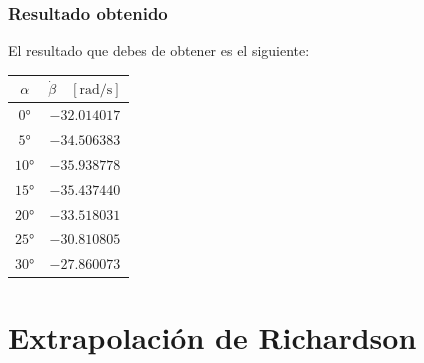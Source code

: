 \begin{frame}[fragile]
\frametitle{Resultado obtenido}
El resultado que debes de obtener es el siguiente:
\begin{table}
\centering
\fontsize{12}{12}\selectfont
\begin{tabular}{c | c}
$\alpha$ & $\dot{\beta} \quad [\si{\radian / \second}]$ \\ \hline
$\ang{0}$ & $-32.014017$ \\ \hline
$\ang{5}$ & $-34.506383$ \\ \hline
$\ang{10}$ & $-35.938778$ \\ \hline
$\ang{15}$ & $-35.437440$ \\ \hline
$\ang{20}$ & $-33.518031$ \\ \hline
$\ang{25}$ & $-30.810805$ \\ \hline
$\ang{30}$ & $-27.860073$ \\ \hline
\end{tabular}
\end{table}
\end{frame}
\section{Extrapolación de Richardson}
